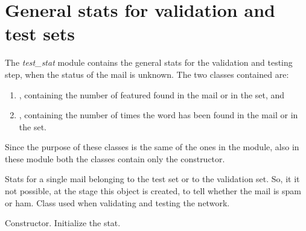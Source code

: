 \documentclass[letterpaper,10pt,english]{sphinxmanual}
\begin{document}
\section{General stats for validation and test sets}
\label{index:general-stats-for-validation-and-test-sets}
The \emph{test\_stat} module contains the general stats for the validation and testing step, when the status of the mail is unknown. The two classes contained are:
\begin{enumerate}
\item {} 
, containing the number of featured found in the mail or in the set, and

\item {} 
, containing the number of times the word has been found in the mail or in the set.

\end{enumerate}

Since the purpose of these classes is the same of the ones in the {\hyperref[index:module-gen_stat]{}} module, also in these module both the classes contain only the constructor.
\label{index:module-test_stat}

\begin{fulllineitems}
\label{index:test_stat.Test_stat}
Stats for a single mail belonging to the test set or to
the validation set. So, it it not possible, at the stage this object
is created, to tell whether the mail is spam or ham. Class used when
validating and testing the network.

\begin{fulllineitems}
\label{index:test_stat.Test_stat.__init__}
Constructor. Initialize the stat.

\end{fulllineitems}


\end{fulllineitems}

\end{document}
